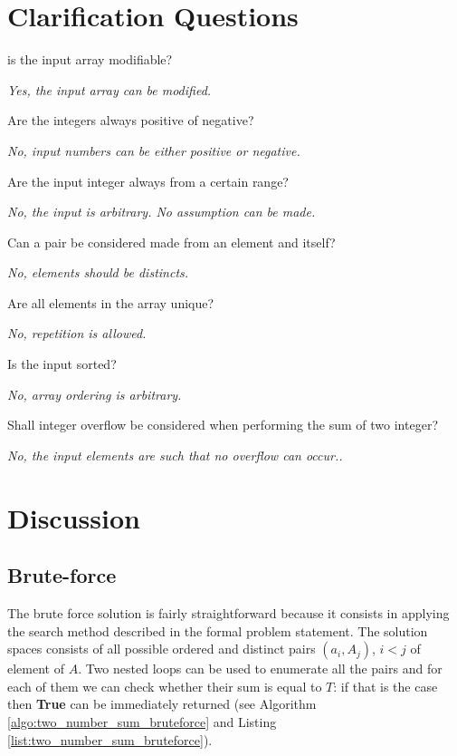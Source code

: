 \section{Clarification Questions}
\begin{QandA}
	\item is the input array modifiable?
	\begin{answered}
		\textit{Yes, the input array can be modified.}
	\end{answered}
	
	\item Are the integers always positive of negative?  
	\begin{answered}
		\textit{No, input numbers can be either positive or negative.}
	\end{answered}
	\item Are the input integer always from a certain range?
	\begin{answered}
		\textit{No, the input is arbitrary. No assumption can be made.}
	\end{answered}
	\item Can a pair be considered made from an element and itself?
	\begin{answered}
		\textit{No, elements should be distincts.}
	\end{answered}
	\item Are all elements in the array unique?
	\begin{answered}
		\textit{No, repetition is allowed.}
	\end{answered}
	\item Is the input sorted?
	\begin{answered}
		\textit{No, array ordering is arbitrary.}
	\end{answered}
	\item Shall integer overflow be considered when performing the sum of two integer? 
	\begin{answered}
		\textit{No, the input elements are such that no overflow can occur..}
	\end{answered}
\end{QandA}


\section{Discussion}

\subsection{Brute-force}
The brute force solution is fairly straightforward because it consists in applying the search method described in the formal problem statement. The solution spaces consists of all possible ordered and distinct pairs $(a_i,A_j)$, $i < j$ of element of $A$. Two nested loops can be used to enumerate all the pairs and for each of them we can check whether their sum is equal to $T$: if that is the case then   \textbf{True} can be immediately returned (see Algorithm \ref{algo:two_number_sum_bruteforce} and Listing \ref{list:two_number_sum_bruteforce}).

